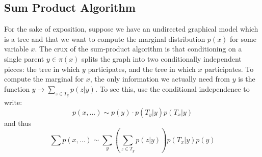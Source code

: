 \subsection{Sum Product Algorithm}

For the sake of exposition, suppose we have an undirected graphical model which is a tree and that we want to compute the marginal distribution $p(x)$ for some variable $x$.  %
The crux of the sum-product algorithm is that conditioning on a single parent $y\in\pi(x)$ splits the graph into two conditionally independent pieces: the tree in which $y$ participates, and the tree in which $x$ participates.  To compute the marginal for $x$, the only information we actually need from $y$ is the function $y \rightarrow \sum_{z \in T_y} p(z | y)$.  To see this, use the conditional independence to write:
$$
p(x, ...) \sim p(y) \cdot p(T_y|y)p(T_x|y)
$$
and thus
$$
\sum p(x, ...) \sim \sum_y\left(\sum_{z \in T_y} p( z | y)\right) p(T_x|y)p(y)
$$